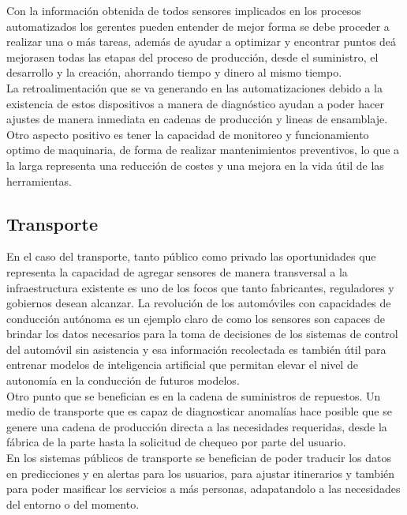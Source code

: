 Con la información obtenida de todos sensores implicados en los procesos automatizados los gerentes pueden entender de mejor forma se debe proceder a realizar una o más tareas, además de ayudar a optimizar y encontrar puntos deá mejorasen  todas las etapas del proceso de producción, desde el suministro, el desarrollo y la creación, ahorrando tiempo y dinero al mismo tiempo\cite{ibmiotindustria}.\\

La retroalimentación que se va generando en las automatizaciones debido a la existencia de estos dispositivos a manera de diagnóstico ayudan a poder hacer ajustes de manera inmediata en cadenas de producción y lineas de ensamblaje. Otro aspecto positivo es tener la capacidad de monitoreo y funcionamiento optimo de maquinaria, de forma de realizar mantenimientos preventivos, lo que a la larga representa una reducción de costes y una mejora en la vida útil de las herramientas. 

\subsection{Transporte}
En el caso del transporte, tanto público como privado las oportunidades que representa la capacidad de agregar sensores de manera transversal a la infraestructura existente es uno de los focos que tanto fabricantes, reguladores y gobiernos desean alcanzar. La revolución de los automóviles  con capacidades de conducción autónoma es un ejemplo claro de como los sensores son capaces de brindar los datos necesarios para la toma de decisiones de los sistemas de control del automóvil sin asistencia y esa información recolectada es también útil para entrenar modelos de inteligencia artificial que permitan elevar el nivel de autonomía en la conducción de futuros modelos\cite{ibmiottransporte1}.\\

Otro punto que se benefician es en la cadena de suministros de repuestos. Un medio de transporte que es capaz de diagnosticar anomalías hace posible que se genere una cadena de producción directa a las necesidades requeridas, desde la fábrica de la parte hasta la solicitud de chequeo por parte del usuario.\\ 
 
En los sistemas públicos de transporte se benefician de poder traducir los datos en predicciones y en alertas para los usuarios, para ajustar itinerarios y también para poder masificar los servicios a más personas, adapatandolo a las necesidades del entorno o del momento.

